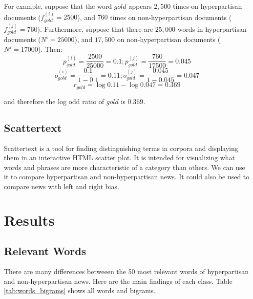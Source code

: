 \documentclass[11pt,a4paper]{article}
\begin{document}
For example, suppose that the word $gold$ appears $2,500$ times on hyperpartisan documents ($f_{gold}^{(i)} = 2500$), and $760$ times on non-hyperpartisan documents ($f_{gold}^{(j)} = 760$). Furthermore, suppose that there are $25,000$ words in hyperpartisan documents ($N^{i} = 25000$), and $17,500$ on non-hyperpartisan documents ($N^{j} = 17000$). Then:
$$p_{gold}^{(i)} = \frac{2500}{25000} = 0.1; p_{gold}^{(j)} = \frac{760}{17500} = 0.045$$
$$o_{gold}^{(i)} = \frac{0.1}{1-0.1} = 0.11; o_{gold}^{(j)} = \frac{0.045}{1-0.045} = 0.047$$
$$r_{gold} = \log{0.11} - \log{0.047} = 0.369$$

and therefore the log odd ratio of $gold$ is $0.369$.

\subsection{Scattertext}

Scattertext \cite{kessler2017scattertext} is a tool for finding distinguishing terms in corpora and displaying them in an interactive HTML scatter plot. It is intended for visualizing what words and phrases are more characteristic of a category than others. We can use it to compare hyperpartisan and non-hyperpartisan news. It could also be used to compare news with left and right bias.

\section{Results}

\subsection{Relevant Words}

There are many differences betweeen the 50 most relevant words of
hyperpartisan and non-hyperpartisan news. Here are the main findings of
each class. Table \ref{tab:words_bigrams} shows all words and bigrams.
\end{document}
